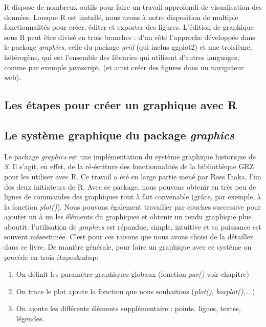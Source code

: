 \documentclass[]{article}
\providecommand{\tightlist}{%
  \setlength{\itemsep}{0pt}\setlength{\parskip}{0pt}}
\begin{document}
R dispose de nombreux outils pour faire un travail approfondi de visualisation
des données. Lorsque R est installé, nous avons à notre disposition de multiple
fonctionnalités pour créer, éditer et exporter des figures.
L'édition de graphique sous R peut être divisé en trois branches : d'un côté
l'approche développée dans le package \emph{graphics}, celle du package \emph{grid} (qui inclus ggplot2) et une troisième, hétérogène, qui est l'ensemble des libraries qui utilisent d'autres languages, comme par exemple javascript, (et ainsi créer des figures dans un navigateur web).

\hypertarget{les-uxe9tapes-pour-cruxe9er-un-graphique-avec-r}{%
\subsection{Les étapes pour créer un graphique avec R}\label{les-uxe9tapes-pour-cruxe9er-un-graphique-avec-r}}

\hypertarget{le-systuxe8me-graphique-du-package-graphics}{%
\subsection{\texorpdfstring{Le système graphique du package \emph{graphics}}{Le système graphique du package graphics}}\label{le-systuxe8me-graphique-du-package-graphics}}

Le package \emph{graphics} est une implémentation du système graphique historique de
\emph{S}. Il s'agit, en effet, de la ré-écriture des fonctionnalités de la
bibliothèque GRZ pour les utiliser avec R. Ce travail a été en large partie mené
par Ross Ihaka, l'un des deux initiateurs de R. Avec ce package, nous pouvons
obtenir en très peu de lignes de commandes des graphiques tout à fait convenable
(grâce, par exemple, à la fonction \emph{plot()}). Nous pouvons également travailler
par couches successive pour ajouter un à un les éléments du graphiques et
obtenir un rendu graphique plus aboutit. l'utilisation de \emph{graphics} est
répandue, simple, intuitive et sa puissance est souvent mésestimée. C'est pour
ces raisons que nous avons choisi de la détailler dans ce livre. De manière
générale, pour faire un graphique avec ce système on procède en trois
étapes\&nbsp:

\begin{enumerate}
\def\labelenumi{\arabic{enumi}.}
\tightlist
\item
  On définit les paramètre graphiques globaux (fonction \emph{par()} voir chapitre)
\item
  On trace le plot ajoute la fonction que nous souhaitons (\emph{plot()}, \emph{boxplot()},\ldots{}.)
\item
  On ajoute les différents éléments supplémentaire : points, lignes, textes, légendes.
\end{enumerate}
\end{document}
